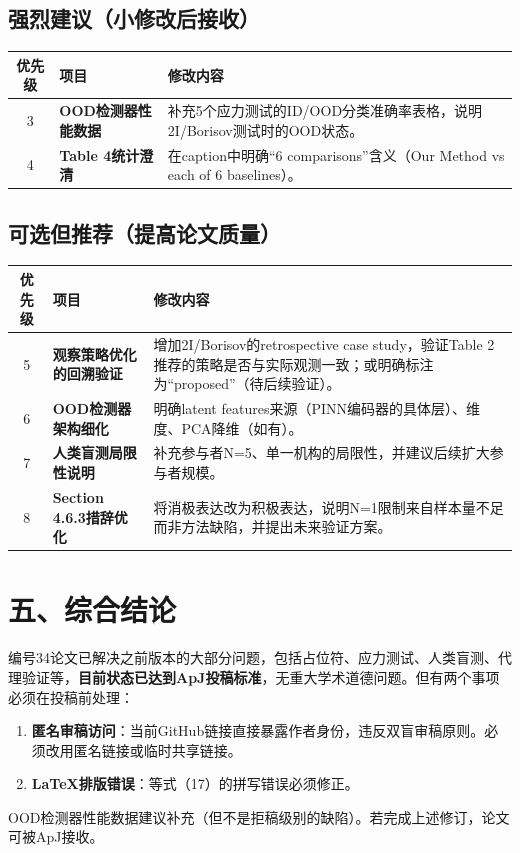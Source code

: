 \documentclass[12pt]{article}
\begin{document}
\subsection{强烈建议（小修改后接收）}

\begin{tabular}{|c|l|p{8cm}|}
\hline
优先级 & 项目 & 修改内容 \\
\hline
3 & \textbf{OOD检测器性能数据} & 补充5个应力测试的ID/OOD分类准确率表格，说明2I/Borisov测试时的OOD状态。 \\
\hline
4 & \textbf{Table 4统计澄清} & 在caption中明确“6 comparisons”含义（Our Method vs each of 6 baselines）。 \\
\hline
\end{tabular}

\subsection{可选但推荐（提高论文质量）}

\begin{tabular}{|c|l|p{8cm}|}
\hline
优先级 & 项目 & 修改内容 \\
\hline
5 & \textbf{观察策略优化的回溯验证} & 增加2I/Borisov的retrospective case study，验证Table 2推荐的策略是否与实际观测一致；或明确标注为“proposed”（待后续验证）。 \\
\hline
6 & \textbf{OOD检测器架构细化} & 明确latent features来源（PINN编码器的具体层）、维度、PCA降维（如有）。 \\
\hline
7 & \textbf{人类盲测局限性说明} & 补充参与者N=5、单一机构的局限性，并建议后续扩大参与者规模。 \\
\hline
8 & \textbf{Section 4.6.3措辞优化} & 将消极表达改为积极表达，说明N=1限制来自样本量不足而非方法缺陷，并提出未来验证方案。 \\
\hline
\end{tabular}

\section{五、综合结论}

编号34论文已解决之前版本的大部分问题，包括占位符、应力测试、人类盲测、代理验证等，\textbf{目前状态已达到ApJ投稿标准}，无重大学术道德问题。但有两个事项必须在投稿前处理：

\begin{enumerate}
    \item \textbf{匿名审稿访问}：当前GitHub链接直接暴露作者身份，违反双盲审稿原则。必须改用匿名链接或临时共享链接。
    \item \textbf{LaTeX排版错误}：等式（17）的拼写错误必须修正。
\end{enumerate}

OOD检测器性能数据建议补充（但不是拒稿级别的缺陷）。若完成上述修订，论文可被ApJ接收。
\end{document}
